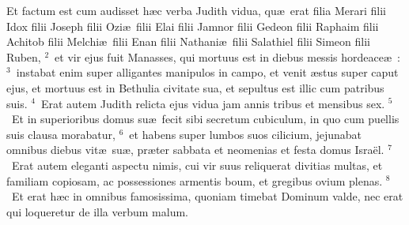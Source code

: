 \bchapter
\lettrine[lines=3,image=true,loversize=0.05,lraise=-0.03]{E}{}t factum est cum audisset h\ae c verba Judith vidua, qu\ae\ erat filia Merari filii Idox filii Joseph filii Ozi\ae\ filii Elai filii Jamnor filii Gedeon filii Raphaim filii Achitob filii Melchi\ae\ filii Enan filii Nathani\ae\ filii Salathiel filii Simeon filii Ruben,
${}^{2}$~et vir ejus fuit Manasses, qui mortuus est in diebus messis hordeace\ae~:
${}^{3}$~instabat enim super alligantes manipulos in campo, et venit \ae stus super caput ejus, et mortuus est in Bethulia civitate sua, et sepultus est illic cum patribus suis.
${}^{4}$~Erat autem Judith relicta ejus vidua jam annis tribus et mensibus sex.
${}^{5}$~Et in superioribus domus su\ae\ fecit sibi secretum cubiculum, in quo cum puellis suis clausa morabatur,
${}^{6}$~et habens super lumbos suos cilicium, jejunabat omnibus diebus vit\ae\ su\ae , pr\ae ter sabbata et neomenias et festa domus Isra\"el.
${}^{7}$~Erat autem eleganti aspectu nimis, cui vir suus reliquerat divitias multas, et familiam copiosam, ac possessiones armentis boum, et gregibus ovium plenas.
${}^{8}$~Et erat h\ae c in omnibus famosissima, quoniam timebat Dominum valde, nec erat qui loqueretur de illa verbum malum.


